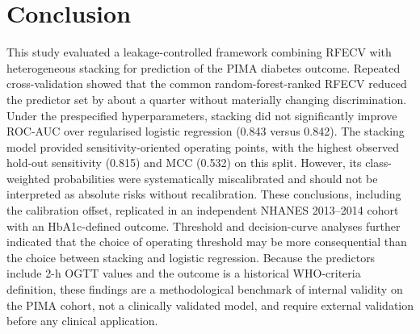 \section{Conclusion}
\label{sec:conclusion}

This study evaluated a leakage-controlled framework combining RFECV with heterogeneous stacking for prediction of the PIMA diabetes outcome. Repeated cross-validation showed that the common random-forest-ranked RFECV reduced the predictor set by about a quarter without materially changing discrimination. Under the prespecified hyperparameters, stacking did not significantly improve ROC-AUC over regularised logistic regression (0.843 versus 0.842). The stacking model provided sensitivity-oriented operating points, with the highest observed hold-out sensitivity (0.815) and MCC (0.532) on this split. However, its class-weighted probabilities were systematically miscalibrated and should not be interpreted as absolute risks without recalibration. These conclusions, including the calibration offset, replicated in an independent NHANES 2013--2014 cohort with an HbA1c-defined outcome. Threshold and decision-curve analyses further indicated that the choice of operating threshold may be more consequential than the choice between stacking and logistic regression. Because the predictors include 2-h OGTT values and the outcome is a historical WHO-criteria definition, these findings are a methodological benchmark of internal validity on the PIMA cohort, not a clinically validated model, and require external validation before any clinical application.
